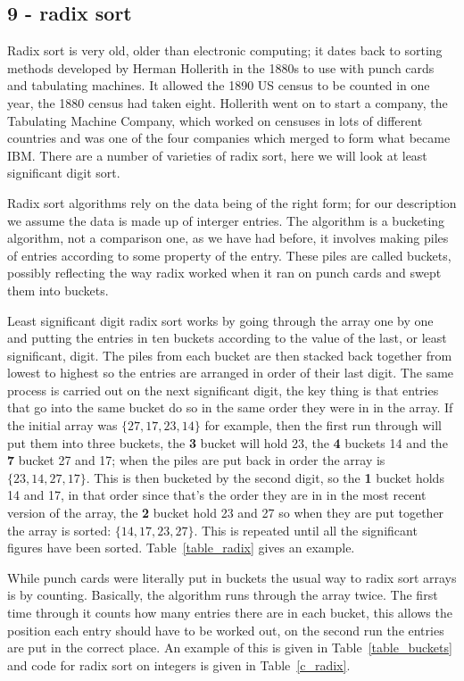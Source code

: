 \documentclass[11pt,a4paper]{scrartcl}
\begin{document}
\subsection*{9 - radix sort}

Radix sort is very old, older than electronic computing; it dates back
to sorting methods developed by Herman Hollerith in the 1880s to use
with punch cards and tabulating machines. It allowed the 1890 US
census to be counted in one year, the 1880 census had taken
eight. Hollerith went on to start a company, the Tabulating Machine
Company, which worked on censuses in lots of different countries and
was one of the four companies which merged to form what became
IBM. There are a number of varieties of radix sort, here we will look
at least significant digit sort. 

Radix sort algorithms rely on the data being of the right form; for
our description we assume the data is made up of interger entries. The
algorithm is a bucketing algorithm, not a comparison one, as we have
had before, it involves making piles of entries according to some
property of the entry. These piles are called buckets, possibly
reflecting the way radix worked when it ran on punch cards and swept
them into buckets.

Least significant digit radix sort works by going through the array
one by one and putting the entries in ten buckets according to the
value of the last, or least significant, digit. The piles from each
bucket are then stacked back together from lowest to highest so the
entries are arranged in order of their last digit. The same process is
carried out on the next significant digit, the key thing is that
entries that go into the same bucket do so in the same order they were
in in the array. If the initial array was $\{27,17,23,14\}$ for
example, then the first run through will put them into three buckets,
the {\bf 3} bucket will hold 23, the {\bf 4} buckets 14 and the {\bf
  7} bucket 27 and 17; when the piles are put back in order the array
is $\{23,14,27,17\}$. This is then bucketed by the second digit, so
the {\bf 1} bucket holds 14 and 17, in that order since that's the
order they are in in the most recent version of the array, the {\bf 2}
bucket hold 23 and 27 so when they are put together the array is
sorted: $\{14,17,23,27\}$. This is repeated until all the significant
figures have been sorted. Table~\ref{table_radix} gives an example.

While punch cards were literally put in buckets the usual way to radix
sort arrays is by counting. Basically, the algorithm runs through the
array twice. The first time through it counts how many entries there
are in each bucket, this allows the position each entry should have to
be worked out, on the second run the entries are put in the correct
place. An example of this is given in Table~\ref{table_buckets} and
code for radix sort on integers is given in Table~\ref{c_radix}.
\end{document}
